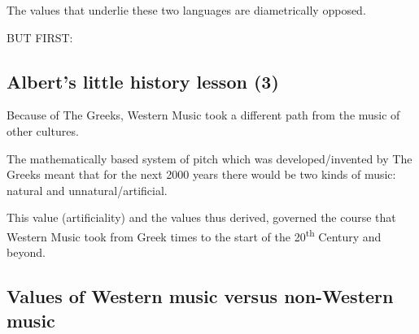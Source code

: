\documentclass{article}
\begin{document}
The values that underlie these two languages are diametrically opposed.

BUT FIRST:

\subsection{Albert’s little history lesson (3)}

Because of The Greeks, Western Music took a different path from the music of other cultures.

The mathematically based system of pitch which was developed/invented by The Greeks meant that for the next 2000 years there would be two kinds of music: natural and unnatural/artificial.

This value (artificiality) and the values thus derived, governed the course that Western Music took from Greek times to the start of the 20\textsuperscript{th} Century and beyond.

\subsection{Values of Western music versus non-Western music}
\end{document}
